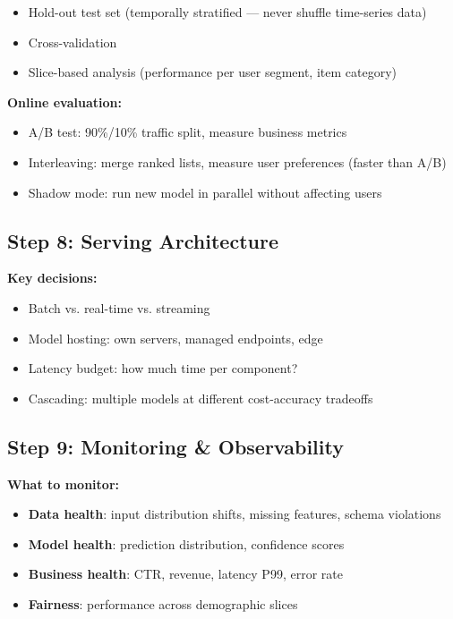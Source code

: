 \documentclass[11pt]{article}
\providecommand{\tightlist}{\setlength{\itemsep}{1pt}\setlength{\parskip}{0pt}}
\begin{document}
\begin{itemize}
\tightlist
\item
  Hold-out test set (temporally stratified --- never shuffle time-series data)
\item
  Cross-validation
\item
  Slice-based analysis (performance per user segment, item category)
\end{itemize}

\textbf{Online evaluation:}

\begin{itemize}
\tightlist
\item
  A/B test: 90\%/10\% traffic split, measure business metrics
\item
  Interleaving: merge ranked lists, measure user preferences (faster than A/B)
\item
  Shadow mode: run new model in parallel without affecting users
\end{itemize}

\subsection{Step 8: Serving Architecture}\label{step-8-serving-architecture}

\textbf{Key decisions:}

\begin{itemize}
\tightlist
\item
  Batch vs. real-time vs. streaming
\item
  Model hosting: own servers, managed endpoints, edge
\item
  Latency budget: how much time per component?
\item
  Cascading: multiple models at different cost-accuracy tradeoffs
\end{itemize}

\subsection{Step 9: Monitoring \& Observability}\label{step-9-monitoring--observability}

\textbf{What to monitor:}

\begin{itemize}
\tightlist
\item
  \textbf{Data health}: input distribution shifts, missing features, schema violations
\item
  \textbf{Model health}: prediction distribution, confidence scores
\item
  \textbf{Business health}: CTR, revenue, latency P99, error rate
\item
  \textbf{Fairness}: performance across demographic slices
\end{itemize}
\end{document}
